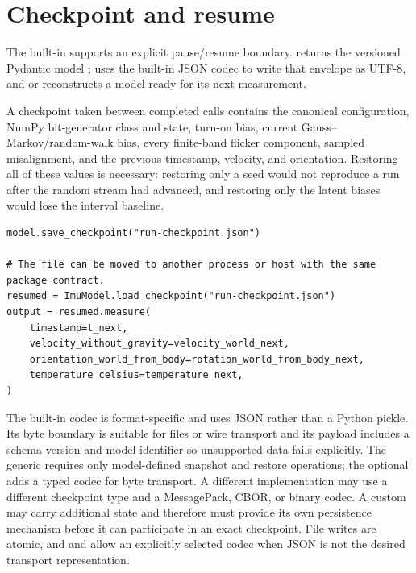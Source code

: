 \documentclass[11pt,oneside,headings=big]{scrreprt}
\begin{document}
    \section{Checkpoint and resume}
    The built-in  supports an explicit pause/resume boundary.
     returns the versioned Pydantic model
    ;  uses the
    built-in JSON codec to write that envelope as UTF-8, and
     or 
    reconstructs a model ready for its next measurement.

    A checkpoint taken between completed  calls contains the
    canonical configuration, NumPy bit-generator class and state, turn-on bias,
    current Gauss--Markov/random-walk bias, every finite-band flicker component,
    sampled misalignment, and the previous timestamp, velocity, and orientation.
    Restoring all of these values is necessary: restoring only a seed would not
    reproduce a run after the random stream had advanced, and restoring only the
    latent biases would lose the interval baseline.

    \begin{lstlisting}[style=imuPython,caption={Pause and resume a stochastic model.},label={lst:checkpoint}]
model.save_checkpoint("run-checkpoint.json")

# The file can be moved to another process or host with the same package contract.
resumed = ImuModel.load_checkpoint("run-checkpoint.json")
output = resumed.measure(
    timestamp=t_next,
    velocity_without_gravity=velocity_world_next,
    orientation_world_from_body=rotation_world_from_body_next,
    temperature_celsius=temperature_next,
)
    \end{lstlisting}

    The built-in codec is format-specific and uses JSON rather than a Python
    pickle. Its byte boundary is suitable for files or wire transport and its
    payload includes a schema version and model identifier so unsupported data
    fails explicitly. The generic 
    requires only model-defined snapshot and restore operations; the optional
     adds a typed codec
    for byte transport. A different implementation may use a different checkpoint
    type and a MessagePack, CBOR, or binary codec. A custom 
    may carry additional state and therefore must provide its own persistence
    mechanism before it can participate in an exact checkpoint. File writes are
    atomic, and  and
     allow an explicitly selected
    codec when JSON is not the desired transport representation.
\end{document}
